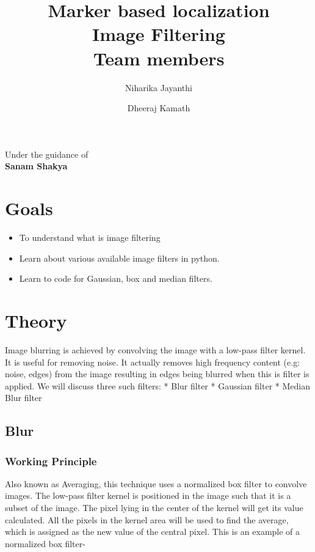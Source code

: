 \documentclass[]{article}
\date{}
\title {Marker based localization \\ [10pt]
	Image Filtering \\[25pt] Team members }
\author {Niharika Jayanthi \and Dheeraj Kamath}
\providecommand{\tightlist}{%
  \setlength{\itemsep}{0pt}\setlength{\parskip}{0pt}}
\begin{document}
\maketitle
\begin{center}
	\begin{large}
		Under the guidance of\\
		\textbf{Sanam Shakya}\\
		\vspace{0.5in}
	\end{large}
\end{center}
\section{Goals}\label{goals}

\begin{itemize}
\tightlist
\item
  To understand what is image filtering
\item
  Learn about various available image filters in python.
\item
  Learn to code for Gaussian, box and median filters.
\end{itemize}

\section{Theory}\label{theory}

Image blurring is achieved by convolving the image with a low-pass
filter kernel. It is useful for removing noise. It actually removes high
frequency content (e.g: noise, edges) from the image resulting in edges
being blurred when this is filter is applied. We will discuss three such
filters: * Blur filter * Gaussian filter * Median Blur filter

\subsection{Blur}\label{blur}

\subsubsection{Working Principle}\label{working-principle}

Also known as Averaging, this technique uses a normalized box filter to
convolve images. The low-pass filter kernel is positioned in the image
such that it is a subset of the image. The pixel lying in the center of
the kernel will get its value calculated. All the pixels in the kernel
area will be used to find the average, which is assigned as the new
value of the central pixel. This is an example of a normalized box
filter-
\end{document}
